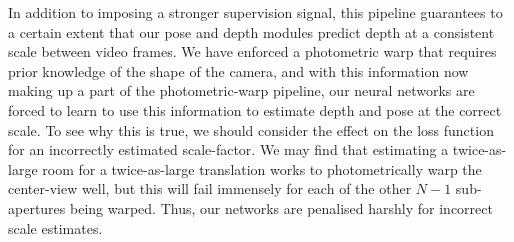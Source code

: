 In addition to imposing a stronger supervision signal, this pipeline guarantees to a certain extent that our pose and depth modules predict depth at a consistent scale between video frames. We have enforced a photometric warp that requires prior knowledge of the shape of the camera, and with this information now making up a part of the photometric-warp pipeline, our neural networks are forced to learn to use this information to estimate depth and pose at the correct scale. To see why this is true, we should consider the effect on the loss function for an incorrectly estimated scale-factor. We may find that estimating a twice-as-large room for a twice-as-large translation works to photometrically warp the center-view well, but this will fail immensely for each of the other $N-1$ sub-apertures being warped. Thus, our networks are penalised harshly for incorrect scale estimates.





